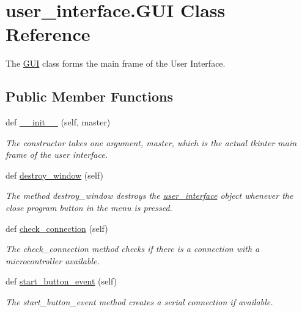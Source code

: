 \hypertarget{classuser__interface_1_1GUI}{}\section{user\+\_\+interface.\+G\+UI Class Reference}
\label{classuser__interface_1_1GUI}


The \hyperlink{classuser__interface_1_1GUI}{G\+UI} class forms the main frame of the User Interface.  


\subsection*{Public Member Functions}
\begin{DoxyCompactItemize}
\item 
def \hyperlink{classuser__interface_1_1GUI_a56cf4f384dbb041483a69bbe54f3e08a}{\+\_\+\+\_\+init\+\_\+\+\_\+} (self, master)
\begin{DoxyCompactList}\small\item\em The constructor takes one argument, master, which is the actual tkinter main frame of the user interface. \end{DoxyCompactList}\item 
def \hyperlink{classuser__interface_1_1GUI_a1e7024c7b8168615d4d8579336d192df}{destroy\+\_\+window} (self)
\begin{DoxyCompactList}\small\item\em The method destroy\+\_\+window destroys the \hyperlink{namespaceuser__interface}{user\+\_\+interface} object whenever the close program button in the menu is pressed. \end{DoxyCompactList}\item 
def \hyperlink{classuser__interface_1_1GUI_a5787b976dce9ca32ce3dacf0b96b8ee7}{check\+\_\+connection} (self)
\begin{DoxyCompactList}\small\item\em The check\+\_\+connection method checks if there is a connection with a microcontroller available. \end{DoxyCompactList}\item 
def \hyperlink{classuser__interface_1_1GUI_a6c36b846f6241589929517ea0d7f0ecf}{start\+\_\+button\+\_\+event} (self)
\begin{DoxyCompactList}\small\item\em The start\+\_\+button\+\_\+event method creates a serial connection if available. \end{DoxyCompactList}\item 

\end{DoxyCompactItemize}
